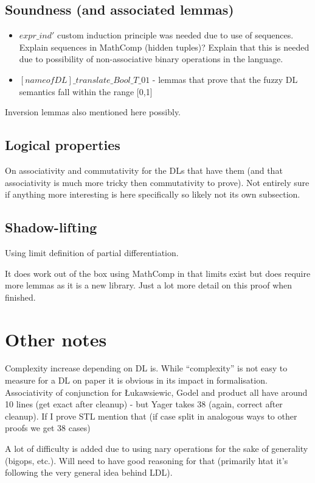 \documentclass[a4paper,UKenglish,cleveref, autoref, thm-restate]{lipics-v2021}
\begin{document}
\subsection{Soundness (and associated lemmas)}

\begin{itemize}
	\item $expr\_ind'$ custom induction principle was needed due to use of sequences. Explain sequences in MathComp (hidden tuples)? Explain that this is needed due to possibility of non-associative binary operations in the language.
	\item $[name of DL]\_translate\_Bool\_T\_01$ - lemmas that prove that the fuzzy DL semantics fall within the range [0,1]
\end{itemize}

Inversion lemmas also mentioned here possibly.

\subsection{Logical properties}

On associativity and commutativity for the DLs that have them (and that associativity is much more tricky then commutativity to prove). Not entirely sure if anything more interesting is here specifically so likely not its own subsection.

\subsection{Shadow-lifting}

Using limit definition of partial differentiation.

It does work out of the box using MathComp in that limits exist but does require more lemmas as it is a new library.
Just a lot more detail on this proof when finished.


\section{Other notes}

Complexity increase depending on DL is. While ``complexity'' is not easy to measure for a DL on paper it is obvious in its impact in formalisation. Associativity of conjunction for Łukawsiewic, Godel and product all have around 10 lines (get exact after cleanup) - but Yager takes 38 (again, correct after cleanup). If I prove STL mention that (if case split in analogous ways to other proofs we get 38 cases)

A lot of difficulty is added due to using nary operations for the sake of generality (bigops, etc.). Will need to have good reasoning for that (primarily htat it's following the very general idea behind LDL).






\appendix
\end{document}
